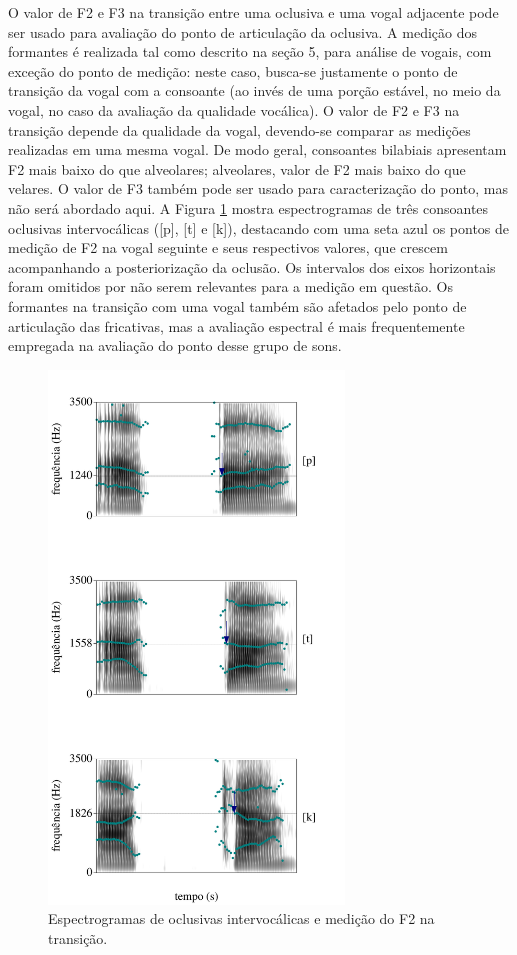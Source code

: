 \documentclass[portuguese]{textolivre}
\begin{document}
O valor de F2 e F3 na transição entre uma oclusiva e uma vogal adjacente pode ser usado para avaliação do ponto de articulação da oclusiva. A medição dos formantes é realizada tal como descrito na seção 5, para análise de vogais, com exceção do ponto de medição: neste caso, busca-se justamente o ponto de transição da vogal com a consoante (ao invés de uma porção estável, no meio da vogal, no caso da avaliação da qualidade vocálica). O valor de F2 e F3 na transição depende da qualidade da vogal, devendo-se comparar as medições realizadas em uma mesma vogal. De modo geral, consoantes bilabiais apresentam F2 mais baixo do que alveolares; alveolares, valor de F2 mais baixo do que velares. O valor de F3 também pode ser usado para caracterização do ponto, mas não será abordado aqui. A Figura \ref{fig14} mostra espectrogramas de três consoantes oclusivas intervocálicas ([p], [t] e [k]), destacando com uma seta azul os pontos de medição de F2 na vogal seguinte e seus respectivos valores, que crescem acompanhando a posteriorização da oclusão. Os intervalos dos eixos horizontais foram omitidos por não serem relevantes para a medição em questão. Os formantes na transição com uma vogal também são afetados pelo ponto de articulação das fricativas, mas a avaliação espectral é mais frequentemente empregada na avaliação do ponto desse grupo de sons. 

\begin{figure}[H]
 \centering
 \includegraphics[width=0.7\textwidth]{Fig14.pdf}
 \caption{Espectrogramas de oclusivas intervocálicas e medição do F2 na transição.}
 \label{fig14}
\end{figure}
\end{document}
